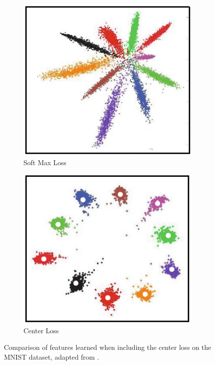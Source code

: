\documentclass[10pt,twocolumn,letterpaper]{article}
\begin{document}
\begin{figure}[!htbp]
  \centering
  \begin{subfigure}[b]{0.45\columnwidth}
    \centering
    \includegraphics[width=\linewidth]{Figures/SoftMaxLoss.png}
    \caption{Soft Max Loss}
    \label{fig:short-a}
  \end{subfigure}
  \hfill
  \begin{subfigure}[b]{0.45\columnwidth}
\centering
    \includegraphics[width=\linewidth]{Figures/CenterLoss.png}
    \caption{Center Loss}
    \label{fig:short-b}
  \end{subfigure}
  \caption{Comparison of features learned when including the center loss on the MNIST dataset, adapted from \cite{Wen2016}.}
  \label{fig:centerloss}
\end{figure}
\end{document}
